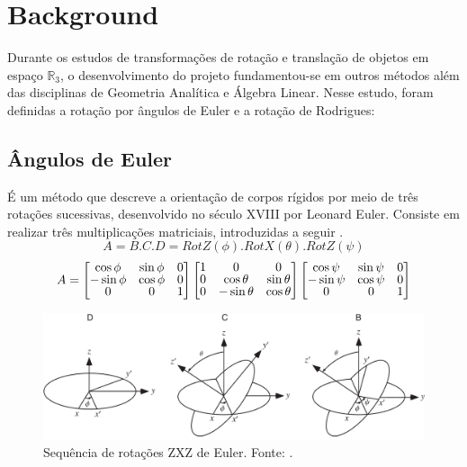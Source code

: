 \chapter{Background}\label{chp:realizacoes}

Durante os estudos de transformações de rotação e translação de objetos em espaço \(\mathbb{R}_3\), o desenvolvimento do projeto fundamentou-se em outros métodos além das disciplinas de Geometria Analítica e Álgebra Linear. Nesse estudo, foram definidas a rotação por ângulos de Euler e a rotação de Rodrigues:

\section{Ângulos de Euler}

É um método que descreve a orientação de corpos rígidos por meio de três rotações sucessivas, desenvolvido no século XVIII por Leonard Euler. Consiste em realizar três multiplicações matriciais, introduzidas a seguir \cite{Euler}.
\[ A = B . C . D = RotZ(\phi) . RotX(\theta) . RotZ(\psi) \]
\[ A =
\renewcommand\arraystretch{.8}
\begin{bmatrix}
    \cos \phi & \sin \phi & 0 \\
    -\sin \phi & \cos \phi & 0 \\
    0 & 0 & 1
\end{bmatrix}
\begin{bmatrix}
    1 & 0 & 0 \\
    0 & \cos \theta & \sin \theta \\
    0 & -\sin \theta & \cos \theta
\end{bmatrix}
\begin{bmatrix}
    \cos \psi & \sin \psi & 0 \\
    -\sin \psi & \cos \psi & 0 \\
    0 & 0 & 1
\end{bmatrix} \]
\begin{figure}[ht]
    \centering
    \includegraphics[width=.8\textwidth]{figuras/euler.png}
    \caption{Sequência de rotações ZXZ de Euler. Fonte: \cite{Euler}.}
    \label{fig:euler_rot}
\end{figure}

